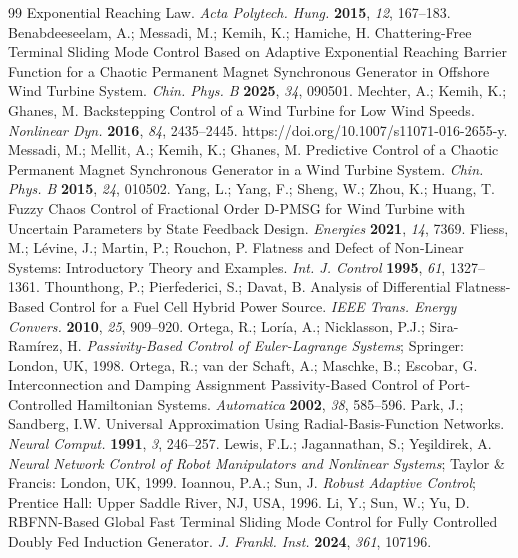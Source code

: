 \documentclass[11pt,a4paper]{article}
\begin{document}
\begin{thebibliography}{99}
Exponential Reaching Law. \emph{Acta Polytech. Hung.} \textbf{2015}, \emph{12}, 167--183.
 Benabdeeseelam, A.; Messadi, M.; Kemih, K.; Hamiche, H. Chattering-Free
Terminal Sliding Mode Control Based on Adaptive Exponential Reaching Barrier Function for a Chaotic
Permanent Magnet Synchronous Generator in Offshore Wind Turbine System. \emph{Chin. Phys. B}
\textbf{2025}, \emph{34}, 090501.
 Mechter, A.; Kemih, K.; Ghanes, M. Backstepping Control of a Wind Turbine for Low
Wind Speeds. \emph{Nonlinear Dyn.} \textbf{2016}, \emph{84}, 2435--2445.
https://doi.org/10.1007/s11071-016-2655-y.
 Messadi, M.; Mellit, A.; Kemih, K.; Ghanes, M. Predictive Control of a Chaotic
Permanent Magnet Synchronous Generator in a Wind Turbine System. \emph{Chin. Phys. B} \textbf{2015},
\emph{24}, 010502.
 Yang, L.; Yang, F.; Sheng, W.; Zhou, K.; Huang, T. Fuzzy Chaos Control of Fractional
Order D-PMSG for Wind Turbine with Uncertain Parameters by State Feedback Design. \emph{Energies}
\textbf{2021}, \emph{14}, 7369.
 Fliess, M.; L\'evine, J.; Martin, P.; Rouchon, P. Flatness and Defect of Non-Linear
Systems: Introductory Theory and Examples. \emph{Int. J. Control} \textbf{1995}, \emph{61}, 1327--1361.
 Thounthong, P.; Pierfederici, S.; Davat, B. Analysis of Differential
Flatness-Based Control for a Fuel Cell Hybrid Power Source. \emph{IEEE Trans. Energy Convers.}
\textbf{2010}, \emph{25}, 909--920.
 Ortega, R.; Lor\'ia, A.; Nicklasson, P.J.; Sira-Ram\'irez, H.
\emph{Passivity-Based Control of Euler-Lagrange Systems}; Springer: London, UK, 1998.
 Ortega, R.; van der Schaft, A.; Maschke, B.; Escobar, G. Interconnection and
Damping Assignment Passivity-Based Control of Port-Controlled Hamiltonian Systems. \emph{Automatica}
\textbf{2002}, \emph{38}, 585--596.
 Park, J.; Sandberg, I.W. Universal Approximation Using Radial-Basis-Function
Networks. \emph{Neural Comput.} \textbf{1991}, \emph{3}, 246--257.
 Lewis, F.L.; Jagannathan, S.; Ye\c{s}ildirek, A. \emph{Neural Network Control of
Robot Manipulators and Nonlinear Systems}; Taylor \& Francis: London, UK, 1999.
 Ioannou, P.A.; Sun, J. \emph{Robust Adaptive Control}; Prentice Hall: Upper Saddle
River, NJ, USA, 1996.
 Li, Y.; Sun, W.; Yu, D. RBFNN-Based Global Fast Terminal Sliding Mode Control for Fully
Controlled Doubly Fed Induction Generator. \emph{J. Frankl. Inst.} \textbf{2024}, \emph{361}, 107196.

\end{thebibliography}
\end{document}
